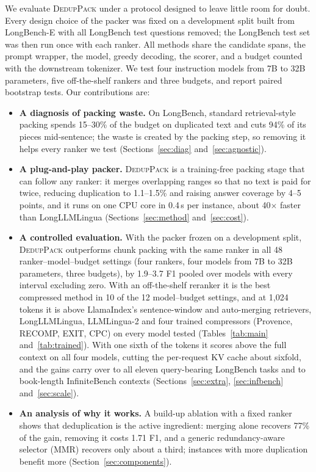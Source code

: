 \documentclass[11pt]{article}
\newcommand{\spk}{\textsc{DedupPack}}
\begin{document}
We evaluate \spk{} under a protocol designed to leave little room for doubt. Every design choice of the packer was fixed on a development split built from LongBench-E with all LongBench test questions removed; the LongBench test set was then run once with each ranker. All methods share the candidate spans, the prompt wrapper, the model, greedy decoding, the scorer, and a budget counted with the downstream tokenizer. We test four instruction models from 7B to 32B parameters, five off-the-shelf rankers and three budgets, and report paired bootstrap tests. Our contributions are:

\begin{itemize}
\item \textbf{A diagnosis of packing waste.} On LongBench, standard retrieval-style packing spends 15--30\% of the budget on duplicated text and cuts 94\% of its pieces mid-sentence; the waste is created by the packing step, so removing it helps every ranker we test (Sections~\ref{sec:diag} and~\ref{sec:agnostic}).
\item \textbf{A plug-and-play packer.} \spk{} is a training-free packing stage that can follow any ranker: it merges overlapping ranges so that no text is paid for twice, reducing duplication to 1.1--1.5\% and raising answer coverage by 4--5 points, and it runs on one CPU core in 0.4\,s per instance, about 40$\times$ faster than LongLLMLingua (Sections~\ref{sec:method} and~\ref{sec:cost}).
\item \textbf{A controlled evaluation.} With the packer frozen on a development split, \spk{} outperforms chunk packing with the same ranker in all 48 ranker--model--budget settings (four rankers, four models from 7B to 32B parameters, three budgets), by 1.9--3.7 F1 pooled over models with every interval excluding zero. With an off-the-shelf reranker it is the best compressed method in 10 of the 12 model--budget settings, and at 1,024 tokens it is above LlamaIndex's sentence-window and auto-merging retrievers, LongLLMLingua, LLMLingua-2 and four trained compressors (Provence, RECOMP, EXIT, CPC) on every model tested (Tables~\ref{tab:main} and~\ref{tab:trained}). With one sixth of the tokens it scores above the full context on all four models, cutting the per-request KV cache about sixfold, and the gains carry over to all eleven query-bearing LongBench tasks and to book-length InfiniteBench contexts (Sections~\ref{sec:extra}, \ref{sec:infbench} and~\ref{sec:scale}).
\item \textbf{An analysis of why it works.} A build-up ablation with a fixed ranker shows that deduplication is the active ingredient: merging alone recovers 77\% of the gain, removing it costs 1.71 F1, and a generic redundancy-aware selector (MMR) recovers only about a third; instances with more duplication benefit more (Section~\ref{sec:components}).
\end{itemize}
\end{document}
